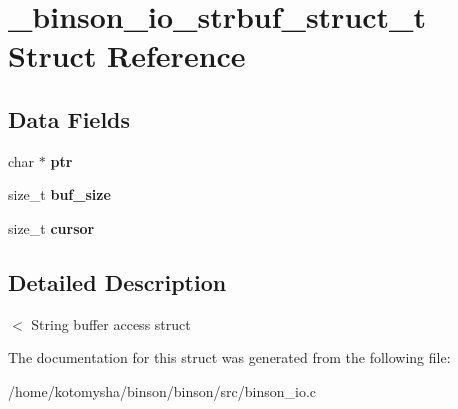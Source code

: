\hypertarget{struct__binson__io__strbuf__struct__t}{\section{\-\_\-binson\-\_\-io\-\_\-strbuf\-\_\-struct\-\_\-t Struct Reference}
\label{struct__binson__io__strbuf__struct__t}
}
\subsection*{Data Fields}
\begin{DoxyCompactItemize}
\item 
\hypertarget{struct__binson__io__strbuf__struct__t_a935adc2e417a61d7eb6f04efb18ba031}{char $\ast$ {\bfseries ptr}}\label{struct__binson__io__strbuf__struct__t_a935adc2e417a61d7eb6f04efb18ba031}

\item 
\hypertarget{struct__binson__io__strbuf__struct__t_ae6563dde7454192031694b48405393d7}{size\-\_\-t {\bfseries buf\-\_\-size}}\label{struct__binson__io__strbuf__struct__t_ae6563dde7454192031694b48405393d7}

\item 
\hypertarget{struct__binson__io__strbuf__struct__t_a403f38d209b4f402839b1963c1be7a98}{size\-\_\-t {\bfseries cursor}}\label{struct__binson__io__strbuf__struct__t_a403f38d209b4f402839b1963c1be7a98}

\end{DoxyCompactItemize}


\subsection{Detailed Description}
$<$ String buffer access struct 

The documentation for this struct was generated from the following file\-:\begin{DoxyCompactItemize}
\item 
/home/kotomysha/binson/binson/src/binson\-\_\-io.\-c\end{DoxyCompactItemize}
